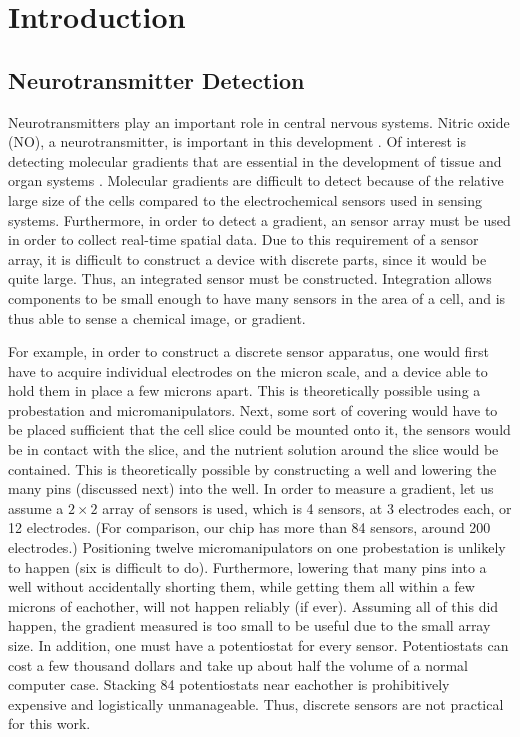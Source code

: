 \chapter{Introduction}

\section{Neurotransmitter Detection}

Neurotransmitters play an important role in central nervous systems. Nitric oxide (NO), a neurotransmitter, is important in this development \cite{bicker2005sag, bulotta2005css, contestabile2004rno}. Of interest is detecting molecular gradients that are essential in the development of tissue and organ systems \cite{wolpert1996ohy, gurdon2001mgi}. Molecular gradients are difficult to detect because of the relative large size of the cells compared to the electrochemical sensors used in sensing systems. Furthermore, in order to detect a gradient, an sensor array must be used in order to collect real-time spatial data. Due to this requirement of a sensor array, it is difficult to construct a device with discrete parts, since it would be quite large. Thus, an integrated sensor must be constructed. Integration allows components to be small enough to have many sensors in the area of a cell, and is thus able to sense a chemical image, or gradient.

For example, in order to construct a discrete sensor apparatus, one would first have to acquire individual electrodes on the micron scale, and a device able to hold them in place a few microns apart. This is theoretically possible using a probestation and micromanipulators. Next, some sort of covering would have to be placed sufficient that the cell slice could be mounted onto it, the sensors would be in contact with the slice, and the nutrient solution around the slice would be contained. This is theoretically possible by constructing a well and lowering the many pins (discussed next) into the well. In order to measure a gradient, let us assume a $2 \times 2$ array of sensors is used, which is 4 sensors, at 3 electrodes each, or 12 electrodes. (For comparison, our chip has more than 84 sensors, around 200 electrodes.) Positioning twelve micromanipulators on one probestation is unlikely to happen (six is difficult to do). Furthermore, lowering that many pins into a well without accidentally shorting them, while getting them all within a few microns of eachother, will not happen reliably (if ever). Assuming all of this did happen, the gradient measured is too small to be useful due to the small array size. In addition, one must have a potentiostat for every sensor. Potentiostats can cost a few thousand dollars and take up about half the volume of a normal computer case. Stacking 84 potentiostats near eachother is prohibitively expensive and logistically unmanageable. Thus, discrete sensors are not practical for this work.

